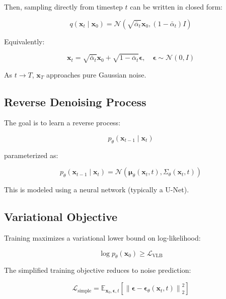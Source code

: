 Then, sampling directly from timestep $t$ can be written in closed form:

\begin{equation}
q(\mathbf{x}_t \mid \mathbf{x}_0) =
\mathcal{N}\left(
\sqrt{\bar{\alpha}_t}\mathbf{x}_0,
(1 - \bar{\alpha}_t) I
\right)
\end{equation}

Equivalently:

\begin{equation}
\mathbf{x}_t =
\sqrt{\bar{\alpha}_t}\mathbf{x}_0 +
\sqrt{1 - \bar{\alpha}_t}\boldsymbol{\epsilon},
\quad
\boldsymbol{\epsilon} \sim \mathcal{N}(0,I)
\end{equation}

As $t \to T$, $\mathbf{x}_T$ approaches pure Gaussian noise.

\subsection{Reverse Denoising Process}

The goal is to learn a reverse process:

\begin{equation}
p_\theta(\mathbf{x}_{t-1} \mid \mathbf{x}_t)
\end{equation}

parameterized as:

\begin{equation}
p_\theta(\mathbf{x}_{t-1} \mid \mathbf{x}_t)
=
\mathcal{N}\left(
\boldsymbol{\mu}_\theta(\mathbf{x}_t, t),
\Sigma_\theta(\mathbf{x}_t, t)
\right)
\end{equation}

This is modeled using a neural network (typically a U-Net).

\subsection{Variational Objective}

Training maximizes a variational lower bound on log-likelihood:

\begin{equation}
\log p_\theta(\mathbf{x}_0)
\ge
\mathcal{L}_{\text{VLB}}
\end{equation}

The simplified training objective reduces to noise prediction:

\begin{equation}
\mathcal{L}_{\text{simple}} =
\mathbb{E}_{\mathbf{x}_0, \boldsymbol{\epsilon}, t}
\left[
\left\|
\boldsymbol{\epsilon}
-
\boldsymbol{\epsilon}_\theta(\mathbf{x}_t, t)
\right\|_2^2
\right]
\end{equation}

